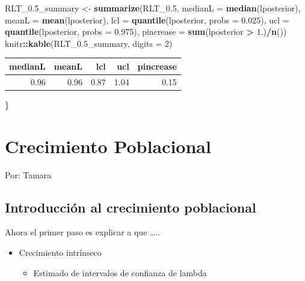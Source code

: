 \documentclass[
]{book}
\newenvironment{Shaded}{\begin{snugshade}}{\end{snugshade}}
\newcommand{\AttributeTok}[1]{\textcolor[rgb]{0.13,0.29,0.53}{#1}}
\newcommand{\DecValTok}[1]{\textcolor[rgb]{0.00,0.00,0.81}{#1}}
\newcommand{\FloatTok}[1]{\textcolor[rgb]{0.00,0.00,0.81}{#1}}
\newcommand{\FunctionTok}[1]{\textcolor[rgb]{0.13,0.29,0.53}{\textbf{#1}}}
\newcommand{\NormalTok}[1]{#1}
\newcommand{\OtherTok}[1]{\textcolor[rgb]{0.56,0.35,0.01}{#1}}
\newcommand{\SpecialCharTok}[1]{\textcolor[rgb]{0.81,0.36,0.00}{\textbf{#1}}}
\providecommand{\tightlist}{%
  \setlength{\itemsep}{0pt}\setlength{\parskip}{0pt}}
\theoremstyle{definition}
\theoremstyle{definition}
\theoremstyle{definition}
\theoremstyle{definition}
\theoremstyle{remark}
\begin{document}
\begin{Shaded}
\begin{Highlighting}[]
\NormalTok{RLT\_0}\FloatTok{.5}\NormalTok{\_summary }\OtherTok{\textless{}{-}} \FunctionTok{summarize}\NormalTok{(RLT\_0}\FloatTok{.5}\NormalTok{,}
                             \AttributeTok{medianL =} \FunctionTok{median}\NormalTok{(lposterior),}
                             \AttributeTok{meanL =} \FunctionTok{mean}\NormalTok{(lposterior),}
                             \AttributeTok{lcl =} \FunctionTok{quantile}\NormalTok{(lposterior, }\AttributeTok{probs =} \FloatTok{0.025}\NormalTok{),}
                             \AttributeTok{ucl =} \FunctionTok{quantile}\NormalTok{(lposterior, }\AttributeTok{probs =} \FloatTok{0.975}\NormalTok{),}
                             \AttributeTok{pincrease =} \FunctionTok{sum}\NormalTok{(lposterior }\SpecialCharTok{\textgreater{}} \FloatTok{1.}\NormalTok{)}\SpecialCharTok{/}\FunctionTok{n}\NormalTok{())}
\NormalTok{knitr}\SpecialCharTok{::}\FunctionTok{kable}\NormalTok{(RLT\_0}\FloatTok{.5}\NormalTok{\_summary, }\AttributeTok{digits =} \DecValTok{2}\NormalTok{)}
\end{Highlighting}
\end{Shaded}

\begin{tabular}{r|r|r|r|r}
\hline
medianL & meanL & lcl & ucl & pincrease\\
\hline
0.96 & 0.96 & 0.87 & 1.04 & 0.15\\
\hline
\end{tabular}

\}

\chapter{Crecimiento Poblacional}\label{crecimiento-poblacional}

Por: Tamara

\section{Introducción al crecimiento poblacional}\label{introducciuxf3n-al-crecimiento-poblacional}

Ahora el primer paso es explicar a que \ldots..

\begin{itemize}
\tightlist
\item
  Crecimiento intrínseco

  \begin{itemize}
  \tightlist
  \item
    Estimado de intervalos de confianza de lambda
  \end{itemize}
\end{itemize}
\end{document}
